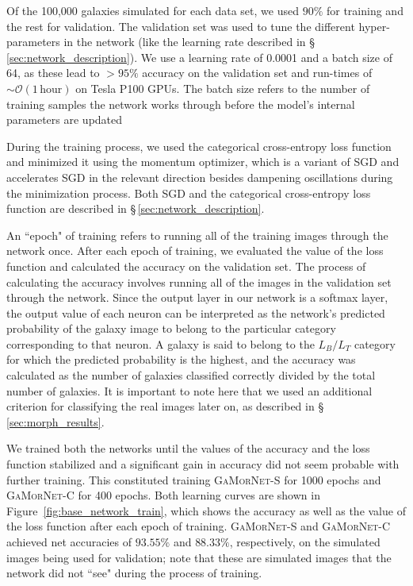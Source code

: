 \documentclass[twocolumn]{aastex63}
\newcommand\gamornet{G\textsc{a}M\textsc{or}N\textsc{et}}
\begin{document}
Of the 100,000 galaxies simulated for each data set, we used $90\%$ for training and the rest for validation. The validation set was used to tune the different hyper-parameters in the network (like the learning rate described in \S\,\ref{sec:network_description}). We use a learning rate of 0.0001 and a batch size of 64, as these lead to $>95\%$ accuracy on the validation set and run-times of $\sim\mathcal{O}(1\mathrm{\,hour})$ on Tesla P100 GPUs. The batch size refers to the number of training samples the network works through before the model's internal parameters are updated

During the training process, we used the categorical cross-entropy loss function and minimized it using the momentum optimizer, which is a variant of SGD and accelerates SGD in the relevant direction besides dampening oscillations during the minimization process. Both SGD and the categorical cross-entropy loss function are described in \S\,\ref{sec:network_description}. 

An ``epoch" of training refers to running all of the training images through the network once. After each epoch of training, we evaluated the value of the loss function and calculated the accuracy on the validation set. The process of calculating the accuracy involves running all of the images in the validation set through the network. Since the output layer in our network is a softmax layer, the output value of each neuron can be interpreted as the network's predicted probability of the galaxy image to belong to the particular category corresponding to that neuron. A galaxy is said to belong to the $L_B/L_T$ category for which the predicted probability is the highest, and the accuracy was calculated as the number of galaxies classified correctly divided by the total number of galaxies. It is important to note here that we used an additional criterion for classifying the real images later on, as described in \S\,\ref{sec:morph_results}.

We trained both the networks until the values of the accuracy and the loss function stabilized and a significant gain in accuracy did not seem probable with further training. This constituted training \gamornet{}-S for 1000 epochs and \gamornet{}-C for 400 epochs. Both learning curves are shown in Figure~\ref{fig:base_network_train}, which shows the accuracy as well as the value of the loss function after each epoch of training. \gamornet{}-S and \gamornet{}-C achieved net accuracies of $93.55\%$ and $88.33\%$, respectively, on the simulated images being used for validation; note that these are simulated images that the network did not ``see" during the process of training. 
\end{document}

